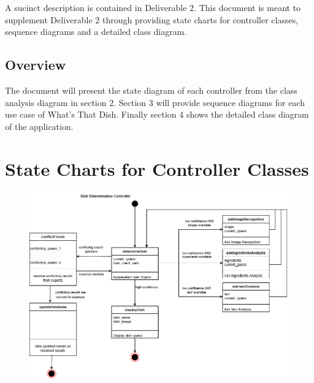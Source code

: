 \documentclass[]{article}
\begin{document}
A sucinct description is contained in Deliverable 2. This document is meant to supplement Deliverable 2 through providing 
state charts for controller classes, sequence diagrams and a detailed class diagram.

\subsection{Overview}
\label{sub:overview}
The document will present the state diagram of each controller from the class analysis diagram in section 2.
Section 3 will provide sequence diagrams for each use case of What's That Dish.
Finally section 4 shows the detailed class diagram of the application.



\section{State Charts for Controller Classes}
\label{sec:state_charts_for_controller_classes}
\begin{figure}[H]
	\centering
   \includegraphics[width=\textwidth]{image/D3_state_diagrams/dish_determination.png}
\end{figure}
\end{document}

